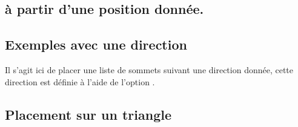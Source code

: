                                                                    
\begin{center}                                                     
\begin{tkzexample}[latex=7cm, ,small]                              
\end{tkzexample}
\end{center}

\subsection{ à partir d'une position donnée.}

\begin{center}                                                     
\begin{tkzexample}[latex=7cm, ,small] 
\end{tkzexample}
\end{center}

\subsection{Exemples avec une direction } 
 Il s'agit ici de placer une liste de sommets suivant une direction donnée, cette direction est définie à l'aide de l'option .  


\begin{center}
\begin{tkzexample}[latex=7cm, ,small]  
\end{tkzexample}
\end{center} 
              

\subsection{Placement sur un triangle }

